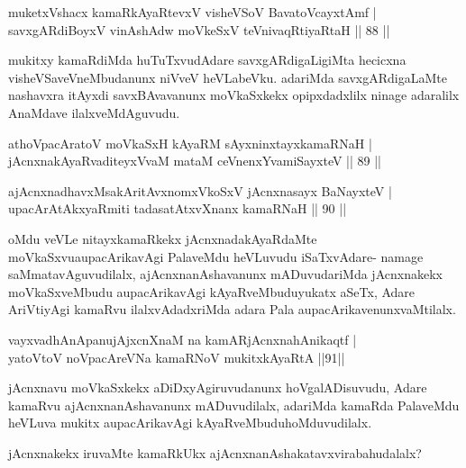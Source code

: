 \begin{shl}
muketxVshacx kamaRkAyaRtevxV visheVSoV BavatoVcayxtAmf |\\
savxgARdiBoyxV vinAshAdw moVkeSxV teV\s nivaqRtiyaRtaH \hfill || 88 ||
\end{shl}

\begin{artha}
mukitxy kamaRdiMda huTuTxvudAdare savxgARdigaLigiMta hecicxna visheVSaveVneMbudanunx niVveV heVLabeVku. adariMda savxgARdigaLaMte nashavxra itAyxdi savxBAvavanunx moVkaSxkekx opipxdadxlilx ninage adaralilx AnaMdave ilalxveMdAguvudu.
\end{artha}

\begin{shl}
athoVpacAratoV moVkaSxH kAyaRM sAyxninxtayxkamaRNaH |\\
jAcnxnakAyaRvaditeyxVvaM mataM ceVnenxYvamiSayxteV \hfill || 89 ||
\end{shl}

\begin{shl}
ajAcnxnadhavxMsakAritAvxnomxVkoSxV jAcnxnasayx BaNayxteV |\\
upacArAtAkxyaRmiti tadasatAtxvXnanx kamaRNaH \hfill || 90 ||
\end{shl} 

\begin{artha}
oMdu veVLe nitayxkamaRkekx jAcnxnadakAyaRdaMte moVkaSxvu\break aupacArikavAgi PalaveMdu heVLuvudu iSaTxvAdare- namage saMmatavAguvudilalx, ajAcnxnanAshavanunx mADuvudariMda jAcnxnakekx moVkaSxveMbudu aupacArikavAgi kAyaRveMbuduyukatx aSeTx, Adare AriVtiyAgi kamaRvu ilalxvAdadxriMda adara Pala aupacArikavenunxvaMtilalx.
\end{artha}

\begin{shl}
vayxvadhAnApanujAjxcnXnaM na kamARjAcnxnahAnikaqtf |\\
yatoV\s toV noVpacAreVNa kamaRNoV mukitxkAyaRtA \hfill ||91||
\end{shl}

\begin{artha}
jAcnxnavu moVkaSxkekx aDiDxyAgiruvudanunx hoVgalADisuvudu, Adare kamaRvu ajAcnxnanAshavanunx mADuvudilalx, adariMda kamaRda PalaveMdu heVLuva mukitx aupacArikavAgi kAyaRveMbudu\break hoMduvudilalx.
\end{artha}

\begin{artha}
jAcnxnakekx iruvaMte kamaRkUkx ajAcnxnanAshakatavxvirabahudalalx?
\end{artha}

